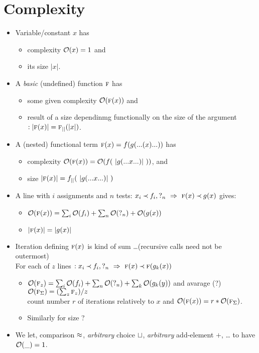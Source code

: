 \documentclass[leqno]{article}
\newcommand{\func}[1]{\mbox{\sc #1}}
\newcommand{\f}[1]{\func{#1}}
\newcommand{\sz}[1]{|#1|} %
\newenvironment{itez}{\begin{itemize}\MyLPar}{\end{itemize}}
\begin{document}
\newpage
\section{Complexity}
%
\begin{itez}
\item
Variable/constant $x$ has 
 \begin{itez} \item complexity ${\cal O}(x)=1$ and \item its size $\sz x$.\end{itez}
\item
A {\em basic} (undefined) function $\f f$ %
has 
 \begin{itez}
  \item some given complexity $\cp(\f f(x))$ and 
  \item result of a size dependinmg
    functionally on the size of the argument $:\sz{\f f(x)}=\f f_{\sz{}}(\sz x)$.
  \end{itez}
\item
A (nested) functional term $\f f(x)= f( g(...(x)...))$ has 
\begin{itez}
 \item complexity $\cp(\f f(x))=\cp(f(\ \sz{g(...x...)}\ ))$, and
 \item size $\sz{\f f(x)} = f_{\sz{}}(\ \sz{g(...x...)}\ )$
 \end{itez}
\item A line with $i$ assignments and $n$ tests: 
 $x_i\Incl f_i, \mbox{?}_n\ \impl\ \f f(x)\Incl g(x)$ gives:
 \begin{itez}
  \item $\cp(\f f(x)) = \sum_i\cp(f_i) + \sum_n\cp(\mbox{?}_n) + \cp(g(x))$
  \item $\sz{\f f(x)} = \sz{g(x)}$
 \end{itez}
\item Iteration defining  $\f f(x)$ is kind of sum
  \ldots (recursive calls need not be outermost)\\
For each of $z$ lines $:x_i\Incl f_i, \mbox{?}_n\ \impl\ \f f(x)\Incl \f f(g_k(x))$ 
 \begin{itez}
  \item $\cp(\f f_z) = \sum_i\cp(f_i) + \sum_n\cp(\mbox{?}_n) + \sum_k\cp(g_k(y))$ and
 avarage (?) $\cp(\f f_\Sigma)=(\sum_z \f f_z)/z$ \\
 count number $r$ of iterations relatively to $x$ and $\cp(\f f(x))=r*\cp(\f f_\Sigma)$.
 \item Similarly for size ?
 \end{itez}
\item We let, comparison $\mathbin{\approx}$, {\em arbitrary} choice $\sqcup$, {\em arbitrary} 
   add-element $+$, \ldots 
to have ${\cal O}(\_)=1$.
\end{itez}
\end{document}
